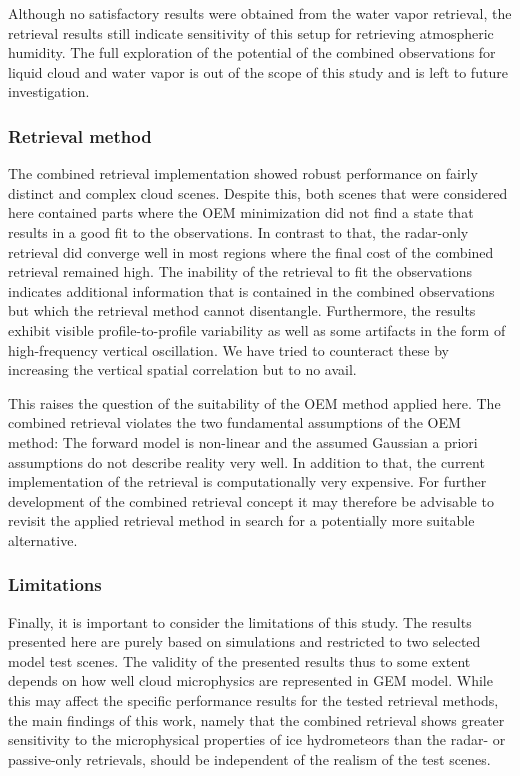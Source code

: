 \documentclass[journal abbreviation, manuscript]{copernicus}
\begin{document}
Although no satisfactory results were obtained from the water vapor retrieval,
the retrieval results still indicate sensitivity of this setup for retrieving
atmospheric humidity. The full exploration of the potential of the combined
observations for liquid cloud and water vapor is out of the scope of this study
and is left to future investigation.

\subsubsection{Retrieval method}

The combined retrieval implementation showed robust performance on fairly
distinct and complex cloud scenes. Despite this, both scenes that were
considered here contained parts where the OEM minimization did not find a state
that results in a good fit to the observations. In contrast to that, the
radar-only retrieval did converge well in most regions where the final cost of
the combined retrieval remained high. The inability of the retrieval to fit the
observations indicates additional information that is contained in the combined
observations but which the retrieval method cannot disentangle. Furthermore, the
results exhibit visible profile-to-profile variability as well as some artifacts
in the form of high-frequency vertical oscillation. We have tried to counteract
these by increasing the vertical spatial correlation but to no avail.

This raises the question of the suitability of the OEM method applied here. The
combined retrieval violates the two fundamental assumptions of the OEM method:
The forward model is non-linear and the assumed Gaussian a priori assumptions do
not describe reality very well. In addition to that, the current implementation
of the retrieval is computationally very expensive. For further development of
the combined retrieval concept it may therefore be advisable to revisit the
applied retrieval method in search for a potentially more suitable alternative.

\subsubsection{Limitations}

Finally, it is important to consider the limitations of this study. The results
presented here are purely based on simulations and restricted to two selected
model test scenes. The validity of the presented results thus to some extent
depends on how well cloud microphysics are represented in GEM model. While this
may affect the specific performance results for the tested retrieval methods,
the main findings of this work, namely that the combined retrieval shows greater
sensitivity to the microphysical properties of ice hydrometeors than the radar-
or passive-only retrievals, should be independent of the realism of the test
scenes.
\end{document}
